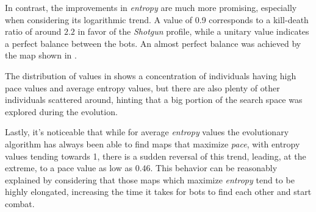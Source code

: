 In contrast, the improvements in \textit{entropy} are much more promising, especially when considering its logarithmic trend. A value of 0.9 corresponds to a kill-death ratio of around $2.2$ in favor of the \textit{Shotgun} profile, while a unitary value indicates a perfect balance between the bots. An almost perfect balance was achieved by the map shown in .

The distribution of values in  shows a concentration of individuals having high pace values and average entropy values, but there are also plenty of other individuals scattered around, hinting that a big portion of the search space was explored during the evolution.

Lastly, it's noticeable that while for average \textit{entropy} values the evolutionary algorithm has always been able to find maps that maximize \textit{pace}, with entropy values tending towards 1, there is a sudden reversal of this trend, leading, at the extreme, to a pace value as low as $0.46$. This behavior can be reasonably explained by considering that those maps which maximize \textit{entropy} tend to be highly elongated, increasing the time it takes for bots to find each other and start combat.


